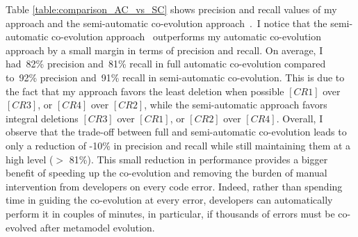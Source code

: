Table \ref{table:comparison_AC_vs_SC} shows precision and recall values of my approach and the semi-automatic co-evolution approach~\cite{Khelladi2020}.~I notice that the semi-automatic co-evolution approach~\cite{Khelladi2020} outperforms my automatic co-evolution approach by a small margin in terms of precision and recall. %
On average, I had~82\% precision and~81\% recall in full automatic co-evolution compared to~92\% precision and~91\% recall in semi-automatic co-evolution. 
This is due to the fact that my approach favors the least deletion when possible $[CR1]$ over $[CR3]$, or $[CR4]$ over $[CR2]$, while the semi-automatic approach favors integral deletions $[CR3]$ over $[CR1]$, or $[CR2]$ over $[CR4]$. %
Overall, I observe that the trade-off between full and semi-automatic co-evolution leads to only a reduction of -10\% in precision and recall while still maintaining them at a high level ($>$ 81\%). This small reduction in performance provides a bigger benefit of speeding up the co-evolution and removing the burden of manual intervention from developers on every code error. Indeed, rather than spending time in guiding the co-evolution at every error, developers can automatically perform it in couples of minutes, in particular, if thousands of errors must be co-evolved after metamodel evolution.


